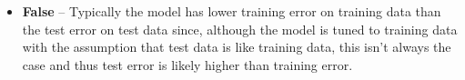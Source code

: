 \begin{itemize}
    \item[] {\bf False} -- Typically the model has lower training error on training data than the test error on test data since, although the model is tuned to training data with the assumption that test data is like training data, this isn't always the case and thus test error is likely higher than training error.
\end{itemize}

